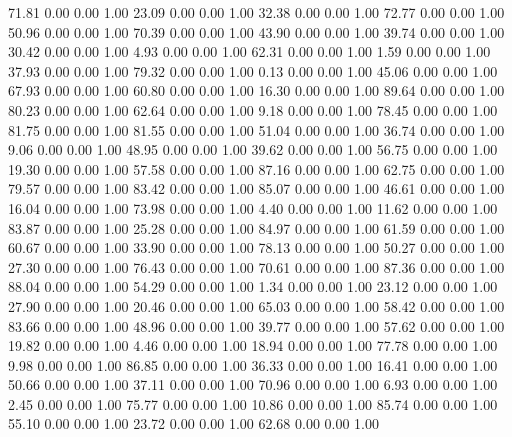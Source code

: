    71.81   0.00   0.00   1.00
   23.09   0.00   0.00   1.00
   32.38   0.00   0.00   1.00
   72.77   0.00   0.00   1.00
   50.96   0.00   0.00   1.00
   70.39   0.00   0.00   1.00
   43.90   0.00   0.00   1.00
   39.74   0.00   0.00   1.00
   30.42   0.00   0.00   1.00
    4.93   0.00   0.00   1.00
   62.31   0.00   0.00   1.00
    1.59   0.00   0.00   1.00
   37.93   0.00   0.00   1.00
   79.32   0.00   0.00   1.00
    0.13   0.00   0.00   1.00
   45.06   0.00   0.00   1.00
   67.93   0.00   0.00   1.00
   60.80   0.00   0.00   1.00
   16.30   0.00   0.00   1.00
   89.64   0.00   0.00   1.00
   80.23   0.00   0.00   1.00
   62.64   0.00   0.00   1.00
    9.18   0.00   0.00   1.00
   78.45   0.00   0.00   1.00
   81.75   0.00   0.00   1.00
   81.55   0.00   0.00   1.00
   51.04   0.00   0.00   1.00
   36.74   0.00   0.00   1.00
    9.06   0.00   0.00   1.00
   48.95   0.00   0.00   1.00
   39.62   0.00   0.00   1.00
   56.75   0.00   0.00   1.00
   19.30   0.00   0.00   1.00
   57.58   0.00   0.00   1.00
   87.16   0.00   0.00   1.00
   62.75   0.00   0.00   1.00
   79.57   0.00   0.00   1.00
   83.42   0.00   0.00   1.00
   85.07   0.00   0.00   1.00
   46.61   0.00   0.00   1.00
   16.04   0.00   0.00   1.00
   73.98   0.00   0.00   1.00
    4.40   0.00   0.00   1.00
   11.62   0.00   0.00   1.00
   83.87   0.00   0.00   1.00
   25.28   0.00   0.00   1.00
   84.97   0.00   0.00   1.00
   61.59   0.00   0.00   1.00
   60.67   0.00   0.00   1.00
   33.90   0.00   0.00   1.00
   78.13   0.00   0.00   1.00
   50.27   0.00   0.00   1.00
   27.30   0.00   0.00   1.00
   76.43   0.00   0.00   1.00
   70.61   0.00   0.00   1.00
   87.36   0.00   0.00   1.00
   88.04   0.00   0.00   1.00
   54.29   0.00   0.00   1.00
    1.34   0.00   0.00   1.00
   23.12   0.00   0.00   1.00
   27.90   0.00   0.00   1.00
   20.46   0.00   0.00   1.00
   65.03   0.00   0.00   1.00
   58.42   0.00   0.00   1.00
   83.66   0.00   0.00   1.00
   48.96   0.00   0.00   1.00
   39.77   0.00   0.00   1.00
   57.62   0.00   0.00   1.00
   19.82   0.00   0.00   1.00
    4.46   0.00   0.00   1.00
   18.94   0.00   0.00   1.00
   77.78   0.00   0.00   1.00
    9.98   0.00   0.00   1.00
   86.85   0.00   0.00   1.00
   36.33   0.00   0.00   1.00
   16.41   0.00   0.00   1.00
   50.66   0.00   0.00   1.00
   37.11   0.00   0.00   1.00
   70.96   0.00   0.00   1.00
    6.93   0.00   0.00   1.00
    2.45   0.00   0.00   1.00
   75.77   0.00   0.00   1.00
   10.86   0.00   0.00   1.00
   85.74   0.00   0.00   1.00
   55.10   0.00   0.00   1.00
   23.72   0.00   0.00   1.00
   62.68   0.00   0.00   1.00
